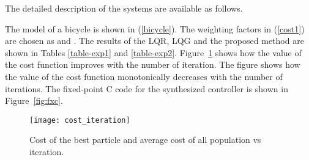 \documentclass{amsart}
\numberwithin{equation}{section}
\def\myparagraph#1{{\smallskip\noindent{\bf #1}}}
\begin{document}
The detailed description of the systems are available as follows. 

\myparagraph{Bicycle}
The model of a bicycle is shown in (\ref{bicycle}). The weighting factors in (\ref{cost1}) are chosen as  and . The results of the LQR, LQG and the proposed method are shown in Tables \ref{table-exp1} and \ref{table-exp2}.
Figure~\ref{fig2} shows how the value of the cost function improves with the number of iteration. The figure shows how
the value of the cost function monotonically decreases with the number of iterations. The fixed-point C code
for the synthesized controller is shown in Figure~\ref{fig:fxc}.

\begin{figure}
\begin{center}
\texttt{[image: cost\_iteration]}
\end{center}
\caption{Cost of the best particle and average cost of all population vs iteration.}
\label{fig2}
\end{figure}
\end{document}
